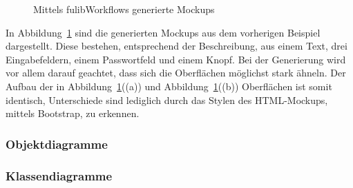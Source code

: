 \begin{figure}%
    \centering
    \qquad
    \caption{Mittels fulibWorkflows generierte Mockups}%
    \label{fig:mockups}%
\end{figure}

In Abbildung~\ref{fig:mockups} sind die generierten Mockups aus dem vorherigen Beispiel dargestellt.
Diese bestehen, entsprechend der Beschreibung, aus einem Text, drei Eingabefeldern, einem Passwortfeld und einem Knopf.
Bei der Generierung wird vor allem darauf geachtet, dass sich die Oberflächen möglichst stark ähneln.
Der Aufbau der in Abbildung~\ref{fig:mockups}((a)) und Abbildung~\ref{fig:mockups}((b)) Oberflächen ist somit identisch, Unterschiede
sind lediglich durch das Stylen des HTML-Mockups, mittels Bootstrap, zu erkennen.

\subsubsection{Objektdiagramme}

\subsubsection{Klassendiagramme}
